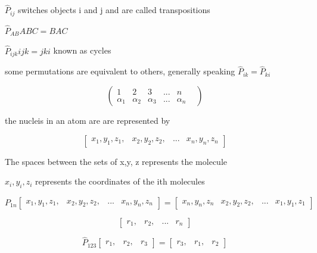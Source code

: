 \documentclass[11pt,a4paper]{book}
\begin{document}
			$\hat{P}_{ij} $ switches objects i and j and are called transpositions
			
			$\hat{P}_{AB} ABC = BAC$ 
			
			$\hat{P}_{ijk} ijk = jki$ known as cycles
			
			some permutations are equivalent to others, generally speaking $\hat{P}_{ik} = \hat{P}_{ki}$
			
			\begin{equation}
			\begin{pmatrix}
			1 & 2 & 3 & ... & n \\
			\alpha_1 & \alpha_2 & \alpha_3 & ... & \alpha_n &
			\end{pmatrix}
			\end{equation}
			
			the nucleis in an atom are are represented by
			
			\begin{equation}
			\begin{bmatrix}
			x_1, y_1, z_1, & x_2,  y_2,  z_2,& ... & x_n, y_n, z_n
			\end{bmatrix}
			\end{equation}
			
			The spaces between the sets of x,y, z represents the molecule 
			
			$x_i, y_i, z_i$ represents the coordinates of the ith molecules
			
			$P_{1n} 			
			\begin{bmatrix}
			x_1, y_1, z_1, & x_2,  y_2,  z_2,& ... & x_n, y_n, z_n
			\end{bmatrix} 
			=
			\begin{bmatrix}
			x_n, y_n, z_n & x_2,  y_2,  z_2,& ... & x_1, y_1, z_1
			\end{bmatrix} 
			$
			
			\begin{equation}
			\begin{bmatrix}
			r_1, & r_2, & ... & r_n
			\end{bmatrix}
			\end{equation}
			
			\begin{equation}
			\hat{P}_{123}
			\begin{bmatrix}
			r_1, & r_2,  & r_3
			\end{bmatrix}
			=
			\begin{bmatrix}
			r_3, & r_1,  & r_2
			\end{bmatrix}			
			\end{equation}
			
\end{document}

